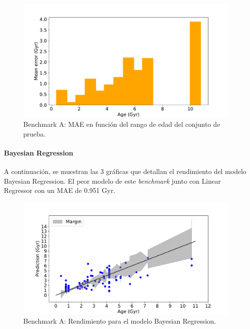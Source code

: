 \begin{figure}[H]
\begin{center}
 \includegraphics[width=0.8\linewidth]{Figuras/Experimentos/B_A_lr_3.pdf}
\end{center}
\caption{Benchmark A: MAE en función del rango de edad del conjunto de prueba.}
 \label{fig:benchA_details_lr_3}
\end{figure}

\paragraph{Bayesian Regression} 
A continuación, se muestran las 3 gráficas que detallan el rendimiento del modelo Bayesian Regression. El peor modelo de este \emph{benchmark} junto con Linear Regressor con un MAE de 0.951 Gyr.%

\begin{figure}[H]
\begin{center}
 \includegraphics[width=0.8\linewidth]{Figuras/Experimentos/B_A_bayes_1.pdf}
\end{center}
\caption{Benchmark A: Rendimiento para el modelo Bayesian Regression.}
 \label{fig:benchA_details_bayes_1}
\end{figure}

